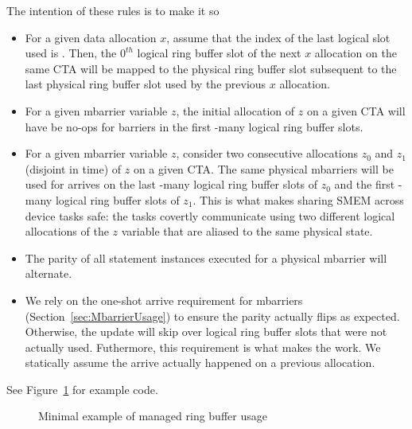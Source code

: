 The intention of these rules is to make it so
\begin{itemize}
  \item For a given data allocation $x$, assume that the index of the last logical slot used is .
    Then, the $0^{th}$ logical ring buffer slot of the next $x$ allocation on the same CTA will be mapped to the physical ring buffer slot subsequent to the last physical ring buffer slot used by the previous $x$ allocation.
  \item For a given mbarrier variable $z$, the initial allocation of $z$ on a given CTA will have  be no-ops for barriers in the first -many logical ring buffer slots.
  \item For a given mbarrier variable $z$, consider two consecutive allocations $z_0$ and $z_1$ (disjoint in time) of $z$ on a given CTA.
    The same physical mbarriers will be used for arrives on the last -many logical ring buffer slots of $z_0$ and the first -many logical ring buffer slots of $z_1$.
    This is what makes sharing SMEM across device tasks safe: the tasks covertly communicate using two different logical allocations of the $z$ variable that are aliased to the same physical state.
  \item The parity of all  statement instances executed for a physical mbarrier will alternate.
  \item We rely on the one-shot arrive requirement for mbarriers (Section~\ref{sec:MbarrierUsage}) to ensure the parity actually flips as expected.
    Otherwise, the  update will skip over logical ring buffer slots that were not actually used.
    Futhermore, this requirement is what makes the  work.
    We statically assume the arrive actually happened on a previous allocation.
\end{itemize}

See Figure~\ref{fig:managed_ring_buffer} for example code.

\begin{figure}[t!]
\codehrule

\caption{Minimal example of managed ring buffer usage}
\label{fig:managed_ring_buffer}
\codehrule
\end{figure}
